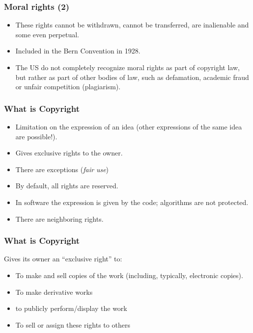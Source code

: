 
\begin{frame}
\frametitle{Moral rights (2)}

\begin{itemize}
\item These rights cannot be withdrawn, cannot be transferred, are inalienable
and some even perpetual.
\item Included in the Bern Convention in 1928. 
\item The US do not completely recognize moral rights as part of copyright law, but rather as part of other bodies of law, such as defamation, academic fraud or unfair competition (plagiarism).
\end{itemize}


\end{frame}





\begin{frame}
\frametitle{What is Copyright}

\begin{itemize}
\item Limitation on the \alert{expression} of an idea (other expressions of the same idea are possible!).
\item Gives exclusive rights to the owner.
\item There are exceptions (\emph{fair use})
\item By default, all rights are reserved.
\item In software the expression is given by the code; algorithms are
not protected.
\item There are neighboring rights.
\end{itemize}

\end{frame}



\begin{frame}
\frametitle{What is Copyright}

Gives its owner an ``exclusive right'' to:

\begin{itemize}
\item To make and sell copies of the work (including,
typically, electronic copies).
\item To make derivative works
\item to publicly perform/display the work
\item To sell or assign these rights to others
\end{itemize}

\end{frame}

